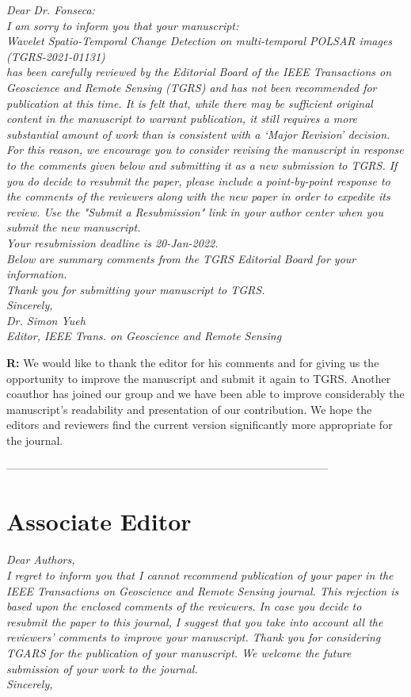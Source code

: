 \documentclass[11pt]{report}
\begin{document}
\textit{
Dear Dr. Fonseca:\\
I am sorry to inform you that your manuscript:\\
Wavelet Spatio-Temporal Change Detection on multi-temporal POLSAR images (TGRS-2021-01131)\\
has been carefully reviewed by the Editorial Board of the IEEE Transactions on Geoscience and Remote Sensing
(TGRS) and has not been recommended for publication at this time. It is felt that, while there may be sufficient original
content in the manuscript to warrant publication, it still requires a more substantial amount of work than is consistent with
a ‘Major Revision’ decision. For this reason, we encourage you to consider revising the manuscript in response to the
comments given below and submitting it as a new submission to TGRS. If you do decide to resubmit the paper, please
include a point-by-point response to the comments of the reviewers along with the new paper in order to expedite its
review. Use the "Submit a Resubmission" link in your author center when you submit the new manuscript.\\
Your resubmission deadline is 20-Jan-2022.\\
Below are summary comments from the TGRS Editorial Board for your information.\\
Thank you for submitting your manuscript to TGRS.\\
Sincerely,\\
Dr. Simon Yueh\\
Editor, IEEE Trans. on Geoscience and Remote Sensing
}

\medskip

\textbf{R:} We would like to thank the editor for his comments and for giving us the opportunity to improve the manuscript and submit it again to TGRS. Another coauthor has joined our group and we have been able to improve considerably the manuscript's readability and presentation of our contribution. We hope the editors and reviewers find the current version significantly more appropriate for the journal.

\noindent---------------------------------------------------------------------------------------
\section*{Associate Editor}

\textit{Dear Authors,\\
I regret to inform you that I cannot recommend publication of your paper in the IEEE Transactions on Geoscience and
Remote Sensing journal. This rejection is based upon the enclosed comments of the reviewers.
In case you decide to resubmit the paper to this journal, I suggest that you take into account all the reviewers’ comments
to improve your manuscript.
Thank you for considering TGARS for the publication of your manuscript. We welcome the future submission of your
work to the journal.\\
Sincerely,}
\end{document}

